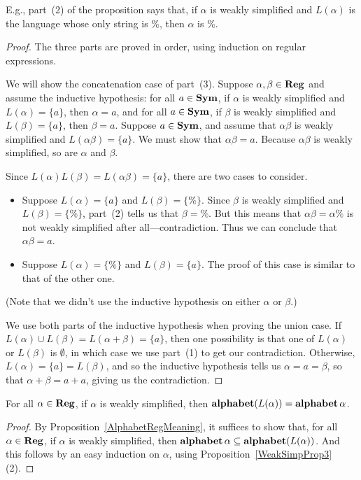 E.g., part~(2) of the proposition says that, if $\alpha$
is weakly simplified and $L(\alpha)$ is the language whose only
string is $\%$, then $\alpha$ is $\%$.

\begin{proof}
The three parts are proved in order, using induction on regular
expressions.

We will show the concatenation case of part~(3).  Suppose
$\alpha,\beta\in\mathbf{Reg}$ and assume the inductive hypothesis: for all
$a\in\mathbf{Sym}$, if $\alpha$ is weakly simplified and $L(\alpha)=\{a\}$,
then $\alpha=a$, and for all $a\in\mathbf{Sym}$, if $\beta$ is weakly
simplified and $L(\beta)=\{a\}$, then $\beta=a$.  Suppose $a\in\mathbf{Sym}$,
and assume that $\alpha\beta$ is weakly simplified and
$L(\alpha\beta)=\{a\}$.  We must show that $\alpha\beta=a$.  Because
$\alpha\beta$ is weakly simplified, so are $\alpha$ and $\beta$.

Since $L(\alpha)L(\beta)=L(\alpha\beta)=\{a\}$, there are two cases to
consider.
\begin{itemize}
\item Suppose $L(\alpha)=\{a\}$ and $L(\beta)=\{\%\}$.  Since $\beta$
  is weakly simplified and $L(\beta)=\{\%\}$, part~(2) tells us that
  $\beta=\%$.  But this means that $\alpha\beta=\alpha\%$ is not
  weakly simplified after all---contradiction.  Thus we can conclude
  that $\alpha\beta=a$.

\item Suppose $L(\alpha)=\{\%\}$ and $L(\beta)=\{a\}$.  The proof of
  this case is similar to that of the other one.
\end{itemize}
(Note that we didn't use the inductive hypothesis on either $\alpha$ or
$\beta$.)

We use both parts of the inductive hypothesis when proving the union
case. If $L(\alpha)\cup L(\beta) = L(\alpha+\beta)=\{a\}$, then one
possibility is that one of $L(\alpha)$ or $L(\beta)$ is $\emptyset$,
in which case we use part~(1) to get our contradiction. Otherwise,
$L(\alpha) = \{a\} = L(\beta)$, and so the inductive hypothesis tells
us $\alpha = a =\beta$, so that $\alpha+\beta = a + a$, giving us the
contradiction.
\end{proof}

\begin{proposition}
\label{WeakSimpProp2}
For all $\alpha\in\mathbf{Reg}$, if $\alpha$ is weakly simplified, then
$\mathbf{alphabet}(L(\alpha)) = \mathbf{alphabet}\,\alpha$.
\end{proposition}

\begin{proof}
By Proposition~\ref{AlphabetRegMeaning}, it suffices to show that,
for all $\alpha\in\mathbf{Reg}$, if $\alpha$ is weakly simplified, then
$\mathbf{alphabet}\,\alpha\subseteq\mathbf{alphabet}(L(\alpha))$.  And this
follows by an easy induction on $\alpha$, using
Proposition~\ref{WeakSimpProp3}(2).
\end{proof}

